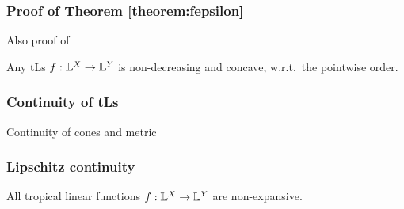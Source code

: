 
\subsubsection{Proof of Theorem \ref{theorem:fepsilon}}


Also proof of 
\begin{proposition}\label{prop:nondecr+conc}
 Any tLs $f:\mathbb{L}^X\to\mathbb{L}^Y$ is non-decreasing and concave, w.r.t.\ the pointwise order.
\end{proposition}


\subsubsection{Continuity of tLs}




Continuity of cones and metric



\subsubsection{Lipschitz continuity}



\begin{proposition}\label{prop:troplinear}
All tropical linear functions $f: \mathbb{L}^{X}\to \mathbb{L}^{Y}$ are non-expansive.  
\end{proposition}







